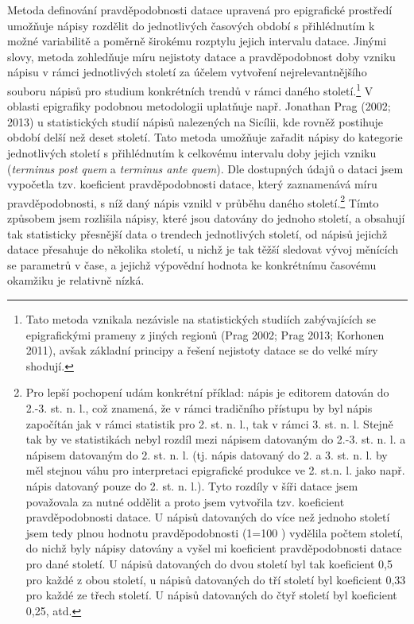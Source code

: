 Metoda definování pravděpodobnosti datace upravená pro epigrafické prostředí umožňuje nápisy rozdělit do jednotlivých časových období s přihlédnutím k možné variabilitě a poměrně širokému rozptylu jejich intervalu datace. Jinými slovy, metoda zohledňuje míru nejistoty datace a pravděpodobnost doby vzniku nápisu v rámci jednotlivých století za účelem vytvoření nejrelevantnějšího souboru nápisů pro studium konkrétních trendů v rámci daného století.\footnote{Tato metoda vznikala nezávisle na statistických studiích zabývajících se epigrafickými prameny z jiných regionů (Prag 2002; Prag 2013; Korhonen 2011), avšak základní principy a řešení nejistoty datace se do velké míry shodují.} V oblasti epigrafiky podobnou metodologii uplatňuje např. Jonathan Prag (2002; 2013) u statistických studií nápisů nalezených na Sicílii, kde rovněž postihuje období delší než deset století. Tato metoda umožňuje zařadit nápisy do kategorie jednotlivých století s přihlédnutím k celkovému intervalu doby jejich vzniku ({\em terminus post quem} a {\em terminus ante quem}). Dle dostupných údajů o dataci jsem vypočetla tzv. koeficient pravděpodobnosti datace, který zaznamenává míru pravděpodobnosti, s níž daný nápis vznikl v průběhu daného století.\footnote{Pro lepší pochopení udám konkrétní příklad: nápis je editorem datován do 2.-3. st. n. l., což znamená, že v rámci tradičního přístupu by byl nápis započítán jak v rámci statistik pro 2. st. n. l., tak v rámci 3. st. n. l. Stejně tak by ve statistikách nebyl rozdíl mezi nápisem datovaným do 2.-3. st. n. l. a nápisem datovaným do 2. st. n. l. (tj. nápis datovaný do 2. a 3. st. n. l. by měl stejnou váhu pro interpretaci epigrafické produkce ve 2. st.n. l. jako např. nápis datovaný pouze do 2. st. n. l.). Tyto rozdíly v šíři datace jsem považovala za nutné oddělit a proto jsem vytvořila tzv. koeficient pravděpodobnosti datace. U nápisů datovaných do více než jednoho století jsem tedy plnou hodnotu pravděpodobnosti (1=100 ) vydělila počtem století, do nichž byly nápisy datovány a vyšel mi koeficient pravděpodobnosti datace pro dané století. U nápisů datovaných do dvou století byl tak koeficient 0,5 pro každé z obou století, u nápisů datovaných do tří století byl koeficient 0,33 pro každé ze třech století. U nápisů datovaných do čtyř století byl koeficient 0,25, atd.} Tímto způsobem jsem rozlišila nápisy, které jsou datovány do jednoho století, a obsahují tak statisticky přesnější data o trendech jednotlivých století, od nápisů jejichž datace přesahuje do několika století, u nichž je tak těžší sledovat vývoj měnících se parametrů v čase, a jejichž výpovědní hodnota ke konkrétnímu časovému okamžiku je relativně nízká.

